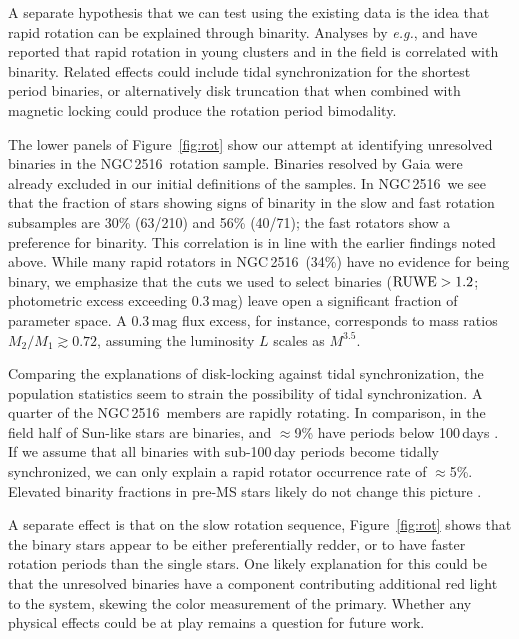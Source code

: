 \documentclass[12pt,twocolumn,tighten]{aastex63}
\newcommand{\cn}{NGC\,2516} %
\begin{document}
A separate hypothesis that we can test using the existing data is the
idea that rapid rotation can be explained through binarity.  Analyses
by {\it e.g.}, \citet{gillen_ngts_2020} and
\citet{simonian_rapid_2019} have reported that rapid rotation in young
clusters and in the field is correlated with binarity.  Related
effects could include tidal synchronization for the shortest period
binaries, or alternatively disk truncation that when combined with
magnetic locking \citep[{\it
e.g.},][]{koenigl_disk_1991,long_locking_2005} could produce the
rotation period bimodality.

The lower panels of Figure~\ref{fig:rot} show our attempt at
identifying unresolved binaries in the \cn\ rotation sample.  Binaries
resolved by Gaia were already excluded in our initial definitions of
the samples.  In \cn\, we see that the fraction of stars showing signs
of binarity in the slow and fast rotation subsamples are 30\% (63/210)
and 56\% (40/71); the fast rotators show a preference for binarity.
This correlation is in line with the earlier findings noted above.
While many rapid rotators in \cn\ (34\%) have no evidence for being
binary, we emphasize that the cuts we used to select binaries (${\rm
RUWE}>1.2$; photometric excess exceeding 0.3\,mag) leave open a
significant fraction of parameter space.  A 0.3\,mag flux excess, for
instance, corresponds to mass ratios $M_2/M_1 \gtrsim 0.72$, assuming
the luminosity $L$ scales as $M^{3.5}$. 

Comparing the explanations of disk-locking against tidal
synchronization, the population statistics seem to strain the
possibility of tidal synchronization.  A quarter of the \cn\ members
are rapidly rotating.  In comparison, in the field half of Sun-like
stars are binaries, and $\approx$9\% have periods below 100\,days
\citep{raghavan_survey_2010}.  If we assume that all binaries with
sub-100\,day periods become tidally synchronized, we can only explain
a rapid rotator occurrence rate of $\approx$5\%.  Elevated binarity
fractions in pre-MS stars likely do not change this picture \citep[see
Sec.~4.4 of][]{duchene_stellar_2013}.

A separate effect is that on the slow rotation sequence,
Figure~\ref{fig:rot} shows that the binary stars appear to be either
preferentially redder, or to have faster rotation periods than the
single stars.  One likely explanation for this could be that the
unresolved binaries have a component contributing additional red light
to the system, skewing the color measurement of the primary.  Whether
any physical effects could be at play remains a question for future
work.
\end{document}

